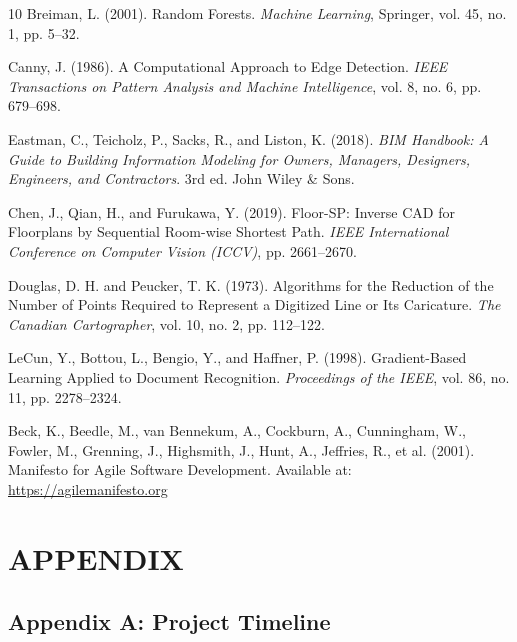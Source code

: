 \documentclass[12pt]{report}
\begin{document}
\begin{thebibliography}{10}
 Breiman, L. (2001). Random Forests. \textit{Machine Learning}, Springer, vol. 45, no. 1, pp. 5--32.

 Canny, J. (1986). A Computational Approach to Edge Detection. \textit{IEEE Transactions on Pattern Analysis and Machine Intelligence}, vol. 8, no. 6, pp. 679--698.

 Eastman, C., Teicholz, P., Sacks, R., and Liston, K. (2018). \textit{BIM Handbook: A Guide to Building Information Modeling for Owners, Managers, Designers, Engineers, and Contractors}. 3rd ed. John Wiley \& Sons.

 Chen, J., Qian, H., and Furukawa, Y. (2019). Floor-SP: Inverse CAD for Floorplans by Sequential Room-wise Shortest Path. \textit{IEEE International Conference on Computer Vision (ICCV)}, pp. 2661--2670.

 Douglas, D. H. and Peucker, T. K. (1973). Algorithms for the Reduction of the Number of Points Required to Represent a Digitized Line or Its Caricature. \textit{The Canadian Cartographer}, vol. 10, no. 2, pp. 112--122.

 LeCun, Y., Bottou, L., Bengio, Y., and Haffner, P. (1998). Gradient-Based Learning Applied to Document Recognition. \textit{Proceedings of the IEEE}, vol. 86, no. 11, pp. 2278--2324.

 Beck, K., Beedle, M., van Bennekum, A., Cockburn, A., Cunningham, W., Fowler, M., Grenning, J., Highsmith, J., Hunt, A., Jeffries, R., et al. (2001). Manifesto for Agile Software Development. Available at: \url{https://agilemanifesto.org}

\end{thebibliography}

\doublespacing
\chapter*{APPENDIX}

\section*{Appendix A: Project Timeline}
\end{document}
